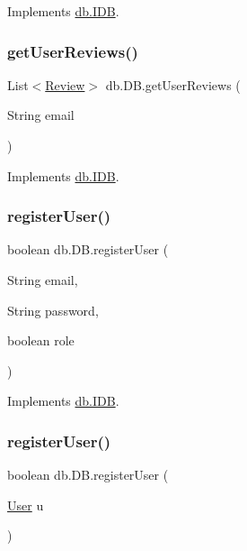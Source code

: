Implements \hyperlink{interfacedb_1_1_i_d_b_a6b8fda48df77b542b8713bc4f035bccf}{db.\+I\+DB}.

\mbox{\label{classdb_1_1_d_b_a9ef4c302b91da17852f09a27a90fb4b5}} 
\subsubsection{\texorpdfstring{get\+User\+Reviews()}{getUserReviews()}}
{\footnotesize\ttfamily List$<$\hyperlink{classserver_1_1data_1_1_review}{Review}$>$ db.\+D\+B.\+get\+User\+Reviews (\begin{DoxyParamCaption}\item[{String}]{email }\end{DoxyParamCaption})}



Implements \hyperlink{interfacedb_1_1_i_d_b_afd7ee8924344c13a64a1363d1a295771}{db.\+I\+DB}.

\mbox{\label{classdb_1_1_d_b_a76fac3ed38eaecd5a073224d6ad51332}} 
\subsubsection{\texorpdfstring{register\+User()}{registerUser()}\hspace{0.1cm}{\footnotesize\ttfamily [1/2]}}
{\footnotesize\ttfamily boolean db.\+D\+B.\+register\+User (\begin{DoxyParamCaption}\item[{String}]{email,  }\item[{String}]{password,  }\item[{boolean}]{role }\end{DoxyParamCaption})}



Implements \hyperlink{interfacedb_1_1_i_d_b_a92913d9357ef22978adc35d3fb9d3590}{db.\+I\+DB}.

\mbox{\label{classdb_1_1_d_b_aa767c59cde3ca8f76c3acbd0c5348608}} 
\subsubsection{\texorpdfstring{register\+User()}{registerUser()}\hspace{0.1cm}{\footnotesize\ttfamily [2/2]}}
{\footnotesize\ttfamily boolean db.\+D\+B.\+register\+User (\begin{DoxyParamCaption}\item[{\hyperlink{classserver_1_1data_1_1_user}{User}}]{u }\end{DoxyParamCaption})}

